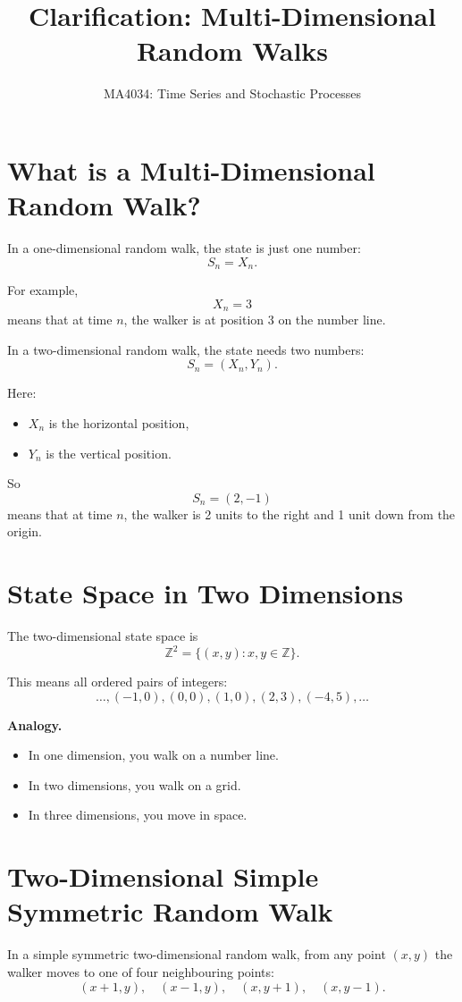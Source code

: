 \documentclass[12pt,a4paper]{article}
\title{\textbf{Clarification: Multi-Dimensional Random Walks}}
\author{MA4034: Time Series and Stochastic Processes}
\date{}
\theoremstyle{notestyle}
\begin{document}
\maketitle

\section{What is a Multi-Dimensional Random Walk?}

In a one-dimensional random walk, the state is just one number:
\[
S_n=X_n.
\]

For example,
\[
X_n=3
\]
means that at time $n$, the walker is at position 3 on the number line.

In a two-dimensional random walk, the state needs two numbers:
\[
S_n=(X_n,Y_n).
\]

Here:
\begin{itemize}[leftmargin=1.2cm]
    \item $X_n$ is the horizontal position,
    \item $Y_n$ is the vertical position.
\end{itemize}

So
\[
S_n=(2,-1)
\]
means that at time $n$, the walker is 2 units to the right and 1 unit down from the origin.

\section{State Space in Two Dimensions}

The two-dimensional state space is
\[
\mathbb{Z}^2=\{(x,y):x,y\in\mathbb{Z}\}.
\]

This means all ordered pairs of integers:
\[
\ldots,(-1,0),(0,0),(1,0),(2,3),(-4,5),\ldots
\]

\textbf{Analogy.}

\begin{itemize}[leftmargin=1.2cm]
    \item In one dimension, you walk on a number line.
    \item In two dimensions, you walk on a grid.
    \item In three dimensions, you move in space.
\end{itemize}

\section{Two-Dimensional Simple Symmetric Random Walk}

In a simple symmetric two-dimensional random walk, from any point $(x,y)$ the walker moves to one of four neighbouring points:
\[
(x+1,y),\quad (x-1,y),\quad (x,y+1),\quad (x,y-1).
\]
\end{document}

